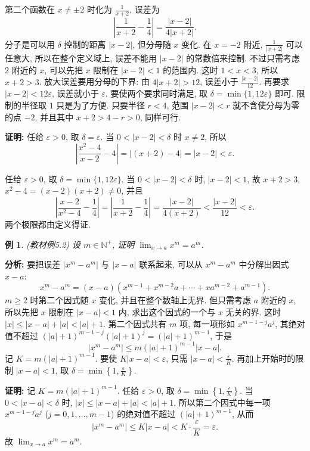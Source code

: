 \documentclass[UTF8,openany]{ctexbook}
\theoremstyle{chinesetextbook}
\newtheorem{example}{例}[section]
\newenvironment{cnproof}{\par\indent\textbf{证明:} \ignorespaces}{\par}
\begin{document}
第二个函数在 $x\ne\pm2$ 时化为 $\displaystyle\frac1{x+2}$, 误差为
\[
\left|\frac1{x+2}-\frac14\right|=\frac{|x-2|}{4|x+2|}.
\]
分子是可以用 $\delta$ 控制的距离 $|x-2|$, 但分母随 $x$ 变化. 在 $x=-2$ 附近, $\displaystyle\frac1{|x+2|}$ 可以任意大, 所以在整个定义域上, 误差不能用 $|x-2|$ 的常数倍来控制. 不过只需考虑 $2$ 附近的 $x$, 可以先把 $x$ 限制在 $|x-2|<1$ 的范围内. 这时 $1<x<3$, 所以 $x+2>3$. 放大误差要用分母的下界: 由 $4|x+2|>12$, 误差小于 $\displaystyle\frac{|x-2|}{12}$. 再要求 $|x-2|<12\varepsilon$, 误差就小于 $\varepsilon$. 要使两个要求同时满足, 取 $\delta=\min\{1,12\varepsilon\}$ 即可. 限制的半径取 $1$ 只是为了方便. 只要半径 $r<4$, 范围 $|x-2|<r$ 就不含使分母为零的点 $-2$, 并且其中 $x+2>4-r>0$, 同样可行.
\begin{cnproof}
任给 $\varepsilon>0$, 取 $\delta=\varepsilon$. 当 $0<|x-2|<\delta$ 时 $x\ne2$, 所以
\[
\left|\frac{x^2-4}{x-2}-4\right|=|(x+2)-4|=|x-2|<\varepsilon.
\]

任给 $\varepsilon>0$, 取 $\delta=\min\{1,12\varepsilon\}$. 当 $0<|x-2|<\delta$ 时, $|x-2|<1$, 故 $x+2>3$, $x^2-4=(x-2)(x+2)\ne0$, 并且
\[
\left|\frac{x-2}{x^2-4}-\frac14\right|=\left|\frac1{x+2}-\frac14\right|=\frac{|x-2|}{4(x+2)}<\frac{|x-2|}{12}<\varepsilon.
\]
两个极限都由定义得证.
\end{cnproof}
\begin{example}\label{ex:5-2}
\textnormal{(教材例5.2)} 设 $m\in\mathbb N^+$, 证明 $\displaystyle\lim_{x\to a}x^m=a^m$.
\end{example}
\par\indent\textbf{分析:} 要把误差 $|x^m-a^m|$ 与 $|x-a|$ 联系起来, 可以从 $x^m-a^m$ 中分解出因式 $x-a$:
\[
x^m-a^m=(x-a)\left(x^{m-1}+x^{m-2}a+\cdots+xa^{m-2}+a^{m-1}\right).
\]
$m\ge2$ 时第二个因式随 $x$ 变化, 并且在整个数轴上无界. 但只需考虑 $a$ 附近的 $x$, 所以先把 $x$ 限制在 $|x-a|<1$ 内, 求出这个因式的一个与 $x$ 无关的界. 这时 $|x|\le|x-a|+|a|<|a|+1$. 第二个因式共有 $m$ 项, 每一项形如 $x^{m-1-j}a^j$, 其绝对值不超过 $(|a|+1)^{m-1-j}(|a|+1)^j=(|a|+1)^{m-1}$, 于是
\[
|x^m-a^m|\le m(|a|+1)^{m-1}|x-a|.
\]
记 $K=m(|a|+1)^{m-1}$. 要使 $K|x-a|<\varepsilon$, 只需 $\displaystyle|x-a|<\frac\varepsilon K$. 再加上开始时的限制 $|x-a|<1$, 取 $\displaystyle\delta=\min\left\{1,\frac\varepsilon K\right\}$.
\begin{cnproof}
记 $K=m(|a|+1)^{m-1}$. 任给 $\varepsilon>0$, 取 $\displaystyle\delta=\min\left\{1,\frac\varepsilon K\right\}$. 当 $0<|x-a|<\delta$ 时, $|x|\le|x-a|+|a|<|a|+1$, 所以第二个因式中每一项 $x^{m-1-j}a^j$ ($j=0,1,\ldots,m-1$) 的绝对值不超过 $(|a|+1)^{m-1}$, 从而
\[
|x^m-a^m|\le K|x-a|<K\cdot\frac\varepsilon K=\varepsilon.
\]
故 $\displaystyle\lim_{x\to a}x^m=a^m$.
\end{cnproof}
\end{document}
